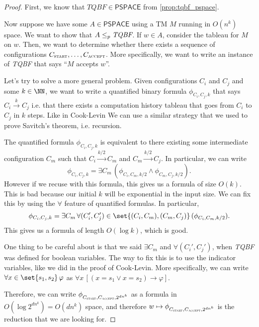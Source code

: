 \documentclass{standalone}
\begin{document}
\begin{proof}
	First, we know that \(\textit{TQBF} \in \mathsf{PSPACE}\) from \cref{prop:tqbf_pspace}.
	
	Now suppose we have some \(A \in \mathsf{PSPACE}\) using a \textsf{TM} \(M\) running in \(O(n^k)\) space. We want to show that \(A \mathrel{\leq_p} \textit{TQBF}\). If \(w \in A\), consider the tableau for \(M\) on \(w\). Then, we want to determine whether there exists a sequence of configurations \(C_{\textsc{start}}, \dots, C_{\textsc{accept}}\). More specifically, we want to write an instance of \textit{TQBF} that says ``\(M\) accepts \(w\)''.

	Let's try to solve a more general problem. Given configurations \(C_i\) and \(C_j\) and some \(k \in \NN\), we want to write a quantified binary formula \(\phi_{C_i, C_j, k}\) that says \(C_i \stackrel{k}{\to} C_j\) i.e. that there exists a computation history tableau that goes from \(C_i\) to \(C_j\) in \(k\) steps. Like in Cook-Levin We can use a similar strategy that we used to prove Savitch's theorem, i.e. recursion.

	The quantified formula \(\phi_{C_i, C_j, k}\) is equivalent to there existing some intermediate configuration \(C_m\) such that \(C_i \xrightarrow{k/2} C_m\) and \(C_m \xrightarrow{k/2} C_j\). In particular, we can write
	\[
		\phi_{C_i, C_j, k} =
			\exists C_m \, (
				\phi_{C_i, C_m, k/2} \land
				\phi_{C_m, C_j, k/2}
			).
	\]
	However if we recuse with this formula, this gives us a formula of size \(O(k)\). This is bad because our initial \(k\) will be exponential in the input size. We can fix this by using the \(\forall\) feature of quantified formulas. In particular,
	\[
		\phi_{C_i, C_j, k} =
			\exists C_m \, \forall (C_i', C_j') \in \set{(C_i, C_m), (C_m, C_j)} \, (
				\phi_{C_i, C_m, k/2}
			).
	\]
	This gives us a formula of length \(O(\log k)\), which is good.

	One thing to be careful about is that we said \(\exists C_m\) and \(\forall(C_i', C_j')\), when \textit{TQBF} was defined for boolean variables. The way to fix this is to use the indicator variables, like we did in the proof of Cook-Levin. More specifically, we can write \(\forall x \in \set{s_1, s_2}\, \varphi\) as \(\forall x \, [(x = s_1 \lor x = s_2) \rightarrow \varphi]\).

	Therefore, we can write \(\phi_{C_{\textsc{start}}, C_{\textsc{accept}}, 2^{d n^k}}\) as a formula in \(O(\log 2^{d n^k}) = O(d n^k)\) space, and therefore \(w \mapsto \phi_{C_{\textsc{start}}, C_{\textsc{accept}}, 2^{d n^k}}\) is the reduction that we are looking for.
\end{proof}
\end{document}
